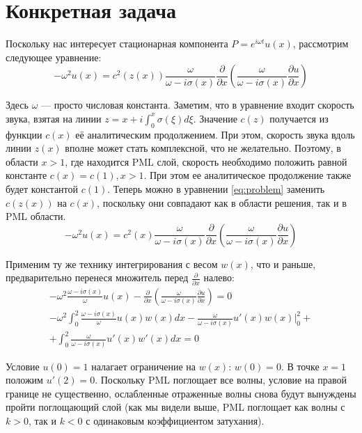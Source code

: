 \documentclass[12pt]{article}
\begin{document}
\section{Конкретная задача}

Поскольку нас интересует стационарная компонента $P = e^{i\omega t}
u(x)$, рассмотрим следующее уравнение:
\begin{equation}
-\omega^2 u(x) = 
c^2(z(x)) 
\frac{\omega}{\omega - i\sigma(x)} 
\frac{\partial}{\partial x}
\left(
\frac{\omega}{\omega - i\sigma(x)} 
\frac{\partial u}{\partial x}
\right)
\label{eq:problem}
\end{equation}

Здесь $\omega$ --- просто числовая константа. Заметим, что в уравнение входит
скорость звука, взятая на линии $z = x + i \int_0^x \sigma(\xi) d\xi$. Значение
$c(z)$ получается из функции $c(x)$ её аналитическим продолжением. При этом,
скорость звука вдоль линии $z(x)$ вполне может стать комплексной, что не
желательно. Поэтому, в области $x > 1$, где находится PML слой, скорость
необходимо положить равной константе $c(x) = c(1), x > 1$. При этом ее
аналитическое продолжение также будет константой $c(1)$. Теперь можно в
уравнении \eqref{eq:problem} заменить $c(z(x))$ на $c(x)$, поскольку они
совпадают как в области решения, так и в PML области.
\begin{equation}
-\omega^2 u(x) = 
c^2(x) 
\frac{\omega}{\omega - i\sigma(x)} 
\frac{\partial}{\partial x}
\left(
\frac{\omega}{\omega - i\sigma(x)} 
\frac{\partial u}{\partial x}
\right)
\label{eq:problem2}
\end{equation}

Применим ту же технику интегрирования с весом $w(x)$, что и раньше,
предварительно перенеся множитель перед $\frac{\partial}{\partial x}$ налево:
\begin{gather}
-\omega^2 \frac{\omega - i\sigma(x)}{\omega} u(x) - \frac{\partial}{\partial x} 
\left(
\frac{\omega}{\omega -i\sigma(x)} \frac{\partial u}{\partial x}
\right) = 0\\
-\omega^2 \int_0^2 \frac{\omega - i\sigma(x)}{\omega} u(x) w(x) dx 
-\frac{\omega}{\omega -i\sigma(x)} u'(x) w(x) \Big|_0^2 
+ \nonumber\\ + \int_0^2 \frac{\omega}{\omega -i\sigma(x)} u'(x) w'(x) dx = 0 
\label{eq:weak}
\end{gather}

Условие $u(0) = 1$ налагает ограничение на $w(x)$: $w(0) = 0$. В точке $x = 1$
положим $u'(2) = 0$. Поскольку PML поглощает все волны, условие на правой
границе не существенно, ослабленные отраженные волны снова будут вынуждены 
пройти поглощающий слой (как мы видели выше, PML поглощает как волны с $k > 0$,
так и $k< 0$ с одинаковым коэффициентом затухания).
\end{document}
